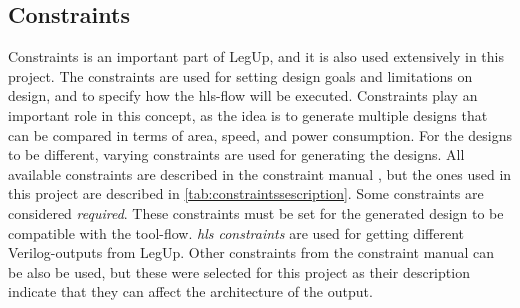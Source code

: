 \subsection{\label{subsec:legupconstraintstheory}Constraints}
Constraints is an important part of LegUp, and it is also used extensively in this project. The constraints are used for setting design goals and limitations on design, and to specify how the \gls{hls}-flow will be executed. Constraints play an important role in this concept, as the idea is to generate multiple designs that can be compared in terms of area, speed, and power consumption. For the designs to be different, varying constraints are used for generating the designs. All available constraints are described in the constraint manual \cite{legupconst}, but the ones used in this project are described in \cref{tab:constraintssescription}. Some constraints are considered \textit{required}. These constraints must be set for the generated design to be compatible with the tool-flow. \textit{\gls{hls} constraints} are used for getting different Verilog-outputs from LegUp. Other constraints from the constraint manual can be also be used, but these were selected for this project as their description indicate that they can affect the architecture of the output.
